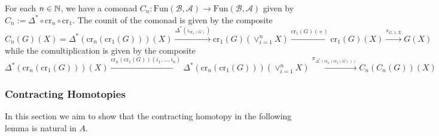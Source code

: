 \begin{defn}[label=defn:crossEffectComonad]
    For each $n \in \mathbb N$, we have a comonad $C_n:\text{Fun}(\mathcal{B},\mathcal{A})\rightarrow \text{Fun}(\mathcal{B},\mathcal{A})$ given by $C_n := \Delta^*\circ \text{cr}_n\circ \text{cr}_1$. The counit of the comonad is given by the composite 
    \begin{equation*}
        C_n(G)(X) = \Delta^*(\text{cr}_n(\text{cr}_1(G)))(X)\xrightarrow{\Delta^*(\iota_{\text{cr}_1(G)})}\text{cr}_1(G)(\lor_{i=1}^nX)\xrightarrow{\text{cr}_1(G)(+)}\text{cr}_1(G)(X)\xrightarrow{s_{G,1,X}}G(X)
    \end{equation*}
    while the comultiplication is given by the composite 
    \begin{equation*}
        \Delta^*(\text{cr}_n(\text{cr}_1(G)))(X)\xrightarrow{\text{cr}_n(\text{cr}_1(G))(i_1,...,i_n)}\Delta^*(\text{cr}_n(\text{cr}_1(G)))(\lor_{i=1}^nX)\xrightarrow{\pi_{\Delta^*(\text{cr}_n(\text{cr}_1(G)))}}C_n(C_n(G))(X)
    \end{equation*}
\end{defn}


\subsubsection{Contracting Homotopies}


In this section we aim to show that the contracting homotopy in the following lemma is natural in $A$.

